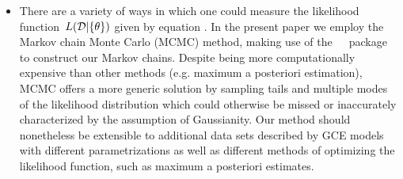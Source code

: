 \documentclass[ms.tex]{subfiles}
\begin{document}
\begin{itemize}
	\item There are a variety of ways in which one could measure the likelihood
	function~$L(\mathcal{D} | \{\theta\})$ given by equation
	.
	In the present paper we employ the Markov chain Monte Carlo (MCMC) method,
	making use of the~\mc~\python~package~\citep{Foreman-Mackey2013} to
	construct our Markov chains.
	Despite being more computationally expensive than other methods (e.g.
	maximum a posteriori estimation), MCMC offers a more generic solution by
	sampling tails and multiple modes of the likelihood distribution which
	could otherwise be missed or inaccurately characterized by the assumption
	of Gaussianity.
	Our method should nonetheless be extensible to additional data sets
	described by GCE models with different parametrizations as well as
	different methods of optimizing the likelihood function, such as maximum
	a posteriori estimates.


\end{itemize}
\end{document}
